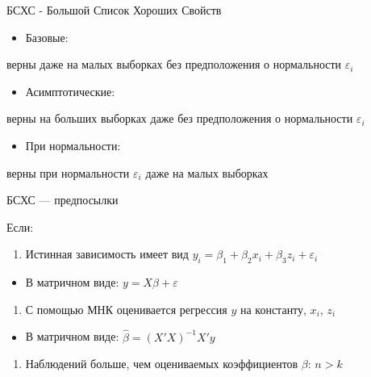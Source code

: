 \documentclass[ignorenonframetext,]{beamer}
\begin{document}
\begin{frame}{БСХС - Большой Список Хороших Свойств}

\begin{itemize}
\itemsep1pt\parskip0pt
\item
  Базовые:
\end{itemize}

верны даже на малых выборках без предположения о нормальности
$\varepsilon_i$

\begin{itemize}
\itemsep1pt\parskip0pt
\item
  Асимптотические:
\end{itemize}

верны на больших выборках даже без предположения о нормальности
$\varepsilon_i$

\begin{itemize}
\itemsep1pt\parskip0pt
\item
  При нормальности:
\end{itemize}

верны при нормальности $\varepsilon_i$ даже на малых выборках

\end{frame}

\begin{frame}{БСХС --- предпосылки}

Если:

\begin{enumerate}
\def\labelenumi{\arabic{enumi}.}
\itemsep1pt\parskip0pt
\item
  Истинная зависимость имеет вид
  $y_i=\beta_1 + \beta_2 x_i + \beta_3 z_i+\varepsilon_i$
\end{enumerate}

\begin{itemize}
\itemsep1pt\parskip0pt
\item
  В матричном виде: $y=X\beta + \varepsilon$
\end{itemize}

\begin{enumerate}
\def\labelenumi{\arabic{enumi}.}
\setcounter{enumi}{1}
\itemsep1pt\parskip0pt
\item
  С помощью МНК оценивается регрессия $y$ на константу, $x_i$, $z_i$
\end{enumerate}

\begin{itemize}
\itemsep1pt\parskip0pt
\item
  В матричном виде: $\hat{\beta}=(X'X)^{-1}X'y$
\end{itemize}

\begin{enumerate}
\def\labelenumi{\arabic{enumi}.}
\setcounter{enumi}{2}
\itemsep1pt\parskip0pt
\item
  Наблюдений больше, чем оцениваемых коэффициентов $\beta$: $n>k$
\end{enumerate}

\end{frame}
\end{document}
